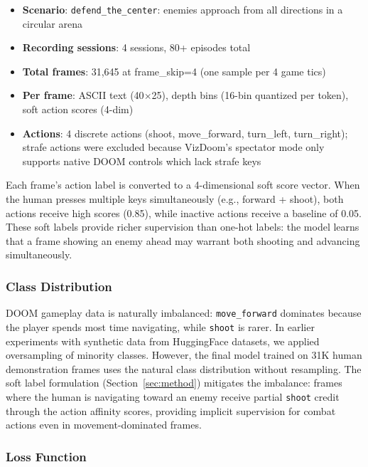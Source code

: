 \documentclass[11pt,a4paper]{article}
\begin{document}
\begin{itemize}
    \item \textbf{Scenario}: \texttt{defend\_the\_center}: enemies approach from all directions in a circular arena
    \item \textbf{Recording sessions}: 4 sessions, 80+ episodes total
    \item \textbf{Total frames}: 31,645 at frame\_skip=4 (one sample per 4 game tics)
    \item \textbf{Per frame}: ASCII text (40$\times$25), depth bins (16-bin quantized per token), soft action scores (4-dim)
    \item \textbf{Actions}: 4 discrete actions (shoot, move\_forward, turn\_left, turn\_right); strafe actions were excluded because VizDoom's spectator mode only supports native DOOM controls which lack strafe keys
\end{itemize}

Each frame's action label is converted to a 4-dimensional soft score vector. When the human presses multiple keys simultaneously (e.g., forward + shoot), both actions receive high scores (0.85), while inactive actions receive a baseline of 0.05. These soft labels provide richer supervision than one-hot labels: the model learns that a frame showing an enemy ahead may warrant both shooting and advancing simultaneously.

\subsubsection{Class Distribution}

DOOM gameplay data is naturally imbalanced: \texttt{move\_forward} dominates because the player spends most time navigating, while \texttt{shoot} is rarer. In earlier experiments with synthetic data from HuggingFace datasets, we applied oversampling of minority classes. However, the final model trained on 31K human demonstration frames uses the natural class distribution without resampling. The soft label formulation (Section~\ref{sec:method}) mitigates the imbalance: frames where the human is navigating toward an enemy receive partial \texttt{shoot} credit through the action affinity scores, providing implicit supervision for combat actions even in movement-dominated frames.

\subsubsection{Loss Function}
\end{document}
